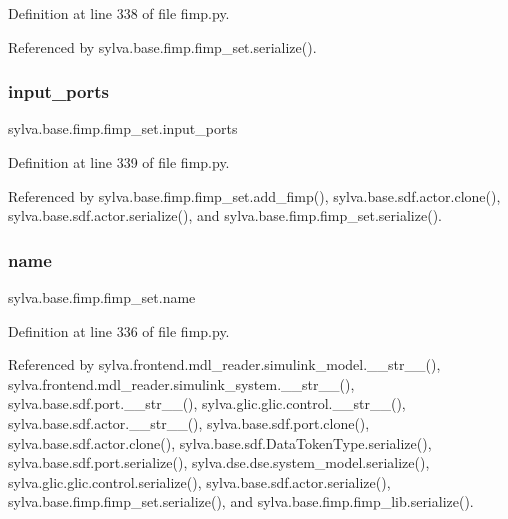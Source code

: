 Definition at line 338 of file fimp.\+py.



Referenced by sylva.\+base.\+fimp.\+fimp\+\_\+set.\+serialize().

\mbox{\label{classsylva_1_1base_1_1fimp_1_1fimp__set_a7e0968ecfd04c497b681319bd7ac70e0}} 
\subsubsection{\texorpdfstring{input\+\_\+ports}{input\_ports}}
{\footnotesize\ttfamily sylva.\+base.\+fimp.\+fimp\+\_\+set.\+input\+\_\+ports}



Definition at line 339 of file fimp.\+py.



Referenced by sylva.\+base.\+fimp.\+fimp\+\_\+set.\+add\+\_\+fimp(), sylva.\+base.\+sdf.\+actor.\+clone(), sylva.\+base.\+sdf.\+actor.\+serialize(), and sylva.\+base.\+fimp.\+fimp\+\_\+set.\+serialize().

\mbox{\label{classsylva_1_1base_1_1fimp_1_1fimp__set_a6bd6ecb11789d4e76631517eca054821}} 
\subsubsection{\texorpdfstring{name}{name}}
{\footnotesize\ttfamily sylva.\+base.\+fimp.\+fimp\+\_\+set.\+name}



Definition at line 336 of file fimp.\+py.



Referenced by sylva.\+frontend.\+mdl\+\_\+reader.\+simulink\+\_\+model.\+\_\+\+\_\+str\+\_\+\+\_\+(), sylva.\+frontend.\+mdl\+\_\+reader.\+simulink\+\_\+system.\+\_\+\+\_\+str\+\_\+\+\_\+(), sylva.\+base.\+sdf.\+port.\+\_\+\+\_\+str\+\_\+\+\_\+(), sylva.\+glic.\+glic.\+control.\+\_\+\+\_\+str\+\_\+\+\_\+(), sylva.\+base.\+sdf.\+actor.\+\_\+\+\_\+str\+\_\+\+\_\+(), sylva.\+base.\+sdf.\+port.\+clone(), sylva.\+base.\+sdf.\+actor.\+clone(), sylva.\+base.\+sdf.\+Data\+Token\+Type.\+serialize(), sylva.\+base.\+sdf.\+port.\+serialize(), sylva.\+dse.\+dse.\+system\+\_\+model.\+serialize(), sylva.\+glic.\+glic.\+control.\+serialize(), sylva.\+base.\+sdf.\+actor.\+serialize(), sylva.\+base.\+fimp.\+fimp\+\_\+set.\+serialize(), and sylva.\+base.\+fimp.\+fimp\+\_\+lib.\+serialize().


